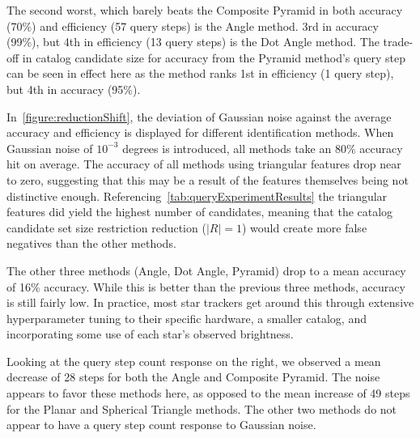 The second worst, which barely beats the Composite Pyramid in both accuracy (70\%) and efficiency (57 query steps) is
the Angle method.
3rd in accuracy (99\%), but 4th in efficiency (13 query steps) is the Dot Angle method.
The trade-off in catalog candidate size for accuracy from the Pyramid method's query step can be seen in effect here as
the method ranks 1st in efficiency (1 query step), but 4th in accuracy (95\%).

In~\autoref{figure:reductionShift}, the deviation of Gaussian noise against the average accuracy and efficiency is
displayed for different identification methods.
When Gaussian noise of $10^{-3}$ degrees is introduced, all methods take an 80\% accuracy hit on average.
The accuracy of all methods using triangular features drop near to zero, suggesting that this may be a result of the
features themselves being not distinctive enough.
Referencing~\autoref{tab:queryExperimentResults} the triangular features did yield the highest number of candidates,
meaning that the catalog candidate set size restriction reduction ($|R| = 1$) would create more false negatives than
the other methods.

The other three methods (Angle, Dot Angle, Pyramid) drop to a mean accuracy of 16\% accuracy.
While this is better than the previous three methods, accuracy is still fairly low.
In practice, most star trackers get around this through extensive hyperparameter tuning to their specific hardware, a
smaller catalog, and incorporating some use of each star's observed brightness.

Looking at the query step count response on the right, we observed a mean decrease of 28 steps for both the Angle and
Composite Pyramid.
The noise appears to favor these methods here, as opposed to the mean increase of 49 steps for the Planar and Spherical
Triangle methods.
The other two methods do not appear to have a query step count response to Gaussian noise.

\begin{figure}
\end{figure}

